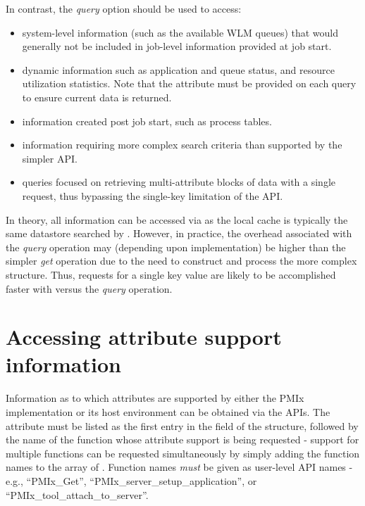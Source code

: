 In contrast, the \emph{query} option should be used to access:

\begin{itemize}
\item system-level information (such as the available \ac{WLM} queues) that would generally not be included in job-level information provided at job start.
\item dynamic information such as application and queue status, and resource utilization statistics. Note that the  attribute must be provided on each query to ensure current data is returned.
\item information created post job start, such as process tables.
\item information requiring more complex search criteria than supported by the simpler  \ac{API}.
\item queries focused on retrieving multi-attribute blocks of data with a single request, thus bypassing the single-key limitation of the  \ac{API}.
\end{itemize}

In theory, all information can be accessed via  as the local cache is typically the same datastore searched by . However, in practice, the overhead associated with the \emph{query} operation may (depending upon implementation) be higher than the simpler \emph{get} operation due to the need to construct and process the more complex  structure. Thus, requests for a single key value are likely to be accomplished faster with  versus the \emph{query} operation.


\section{Accessing attribute support information}
\label{chap:api_job_mgmt:queryattrs}

Information as to which attributes are supported by either the \ac{PMIx} implementation or its host environment can be obtained via the  \acp{API}. The  attribute must be listed as the first entry in the  field of the  structure, followed by the name of the function whose attribute support is being requested - support for multiple functions can be requested simultaneously by simply adding the function names to the array of . Function names \emph{must} be given as user-level \ac{API} names - e.g., ``PMIx_Get'', ``PMIx_server_setup_application'', or ``PMIx_tool_attach_to_server''.

